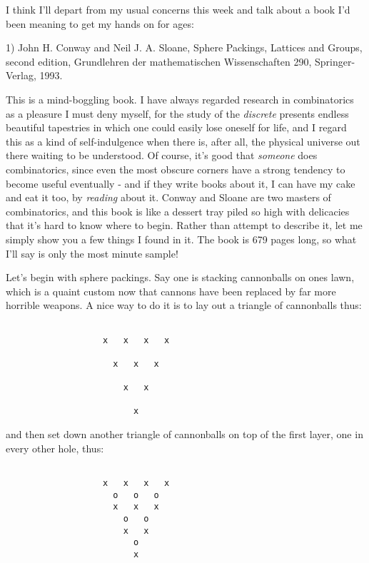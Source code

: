 

I think I'll depart from my usual concerns this week and talk about a
book I'd been meaning to get my hands on for ages:

1) John H. Conway and Neil J. A. Sloane, Sphere Packings, Lattices and
Groups, second edition, Grundlehren der mathematischen Wissenschaften
290, Springer-Verlag, 1993.


This is a mind-boggling book.  I have always regarded research in
combinatorics as a pleasure I must deny myself, for the study
of the \emph{discrete} presents endless beautiful tapestries in which one
could easily lose oneself for life, and I regard this as a kind of
self-indulgence when there is, after all, the physical universe out
there waiting to be understood.  Of course, it's good that \emph{someone}
does combinatorics, since even the most obscure corners have a strong
tendency to become useful eventually - and if they write books about it,
I can have my cake and eat it too, by \emph{reading} about it.  Conway and
Sloane are two masters of combinatorics, and this book is like a dessert
tray piled so high with delicacies that it's hard to know where to
begin.  Rather than attempt to describe it, let me simply show you a few
things I found in it.  The book is 679 pages long, so what I'll say is
only the most minute sample!

Let's begin with sphere packings.  Say one is stacking cannonballs on
ones lawn, which is a quaint custom now that cannons have been replaced
by far more horrible weapons.  A nice way to do it is to lay out a
triangle of cannonballs thus:
 

\begin{verbatim}

                   x   x   x   x

                     x   x   x

                       x   x

                         x

\end{verbatim}
    

and then set down another triangle of cannonballs on top of the first
layer, one in every other hole, thus:

 

\begin{verbatim}

                   x   x   x   x
                     o   o   o
                     x   x   x
                       o   o
                       x   x
                         o
                         x

\end{verbatim}
    

